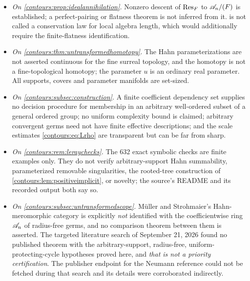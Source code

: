 \documentclass[11pt,letterpaper]{article}
\theoremstyle{definition}
\theoremstyle{remark}
\numberwithin{equation}{section}
\begin{document}
\begin{itemize}
{with the entire class of surcomplex solutions of $|F_j|=t^{\kappa_j\rho}$} --- no
such identification is needed for any integral proved here.
\item \emph{On \cref{contours:prop:idealannihilation}.} Nonzero descent of
$\operatorname{Res}_F$ to $\mathscr A_n/(F)$ is established; a perfect-pairing or flatness theorem is
not inferred from it.  is not called a
conservation law for local algebra length, which would additionally require the
finite-flatness identification.
\item \emph{On \cref{contours:thm:untransformedhomotopy}.} The Hahn
parameterizations are not asserted continuous for the fine surreal topology, and
the homotopy is not a fine-topological homotopy; the parameter $u$ is an ordinary
real parameter. All supports, covers and parameter manifolds are set-sized.
\item \emph{On \cref{contours:subsec:construction}.} A finite coefficient
dependency set supplies no decision procedure for membership in an arbitrary
well-ordered subset of a general ordered group; no uniform complexity bound is
claimed; arbitrary convergent germs need not have finite effective descriptions;
and the scale estimates \eqref{contours:eq:Lrho} are transparent but can be far
from sharp.
\item \emph{On \cref{contours:rem:leraychecks}.} The $632$ exact symbolic checks
are finite examples only. They do not verify arbitrary-support Hahn summability,
parameterized removable singularities, the rooted-tree construction of
\cref{contours:lem:positiveimplicit}, or novelty; the source's README and its
recorded output both say so.
\item \emph{On \cref{contours:subsec:untransformedscope}.} M\"uller and
Strohmaier's Hahn-meromorphic category \cite{MuellerStrohmaier} is explicitly
\emph{not} identified with the coefficientwise ring $\mathscr A_n$ of radius-free germs,
and no comparison theorem between them is asserted. The targeted literature
search of September 21, 2026 found no published theorem with the
arbitrary-support, radius-free, uniform-protecting-cycle hypotheses proved here,
and \emph{that is not a priority certification}. The publisher endpoint for the
Neumann reference \cite{Neumann} could not be fetched during that search and its
details were corroborated indirectly.
\end{itemize}
\end{document}
